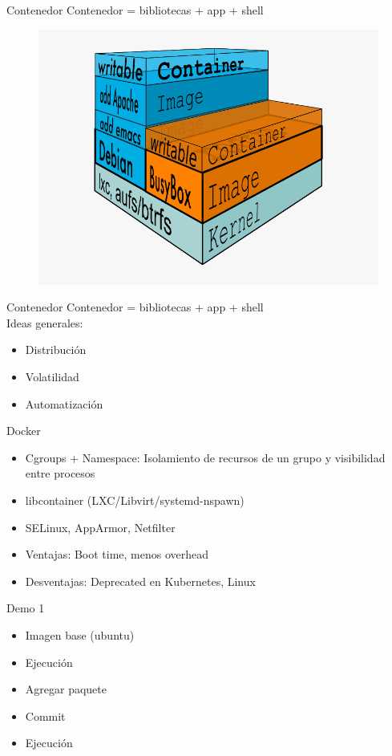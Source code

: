 \documentclass[aspectratio=169]{beamer}
\begin{document}
\begin{frame}{Contenedor}
    Contenedor = bibliotecas + app + shell
    \begin{figure}
        \centering
        \includegraphics[width=0.6\linewidth]{Images/container.png}
        \label{fig:container}
    \end{figure}
\end{frame}

\begin{frame}{Contenedor}
    Contenedor = bibliotecas + app + shell\\
    
    Ideas generales:
    \begin{itemize}
        \item Distribución
        \item Volatilidad
        \item Automatización
    \end{itemize}
\end{frame}


\begin{frame}{Docker}
    \begin{itemize}
        \item Cgroups + Namespace: Isolamiento de recursos de un grupo y visibilidad entre procesos
        \item libcontainer (LXC/Libvirt/systemd-nspawn)
        \item SELinux, AppArmor, Netfilter
        \item Ventajas: Boot time, menos overhead
        \item Desventajas: Deprecated en Kubernetes, Linux
    \end{itemize}
\end{frame}


\begin{frame}{Demo 1}
    \begin{itemize}
        \item Imagen base (ubuntu)
        \item Ejecución
        \item Agregar paquete
        \item Commit
        \item Ejecución
    \end{itemize}
\end{frame}
\end{document}
